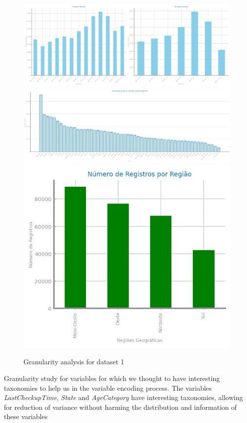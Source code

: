 \documentclass[10pt]{extarticle}
\begin{document}
\begin{figure}[H]
\centering\includegraphics[scale=0.5]{images/dataset1/data_preparation/CovidPos_AgeCategory_study_for_granularity.png}
\includegraphics[scale=0.4]{images/dataset1/data_preparation/CovidPos_State_study_for_granularity.png}
\centering\includegraphics[scale=1.0]{images/dataset1/data_preparation/CovidPos_State_per_region_study_for_granularity.png}
\caption{Granularity analysis for dataset 1}
\end{figure}
Granularity study for variables for which we thought to have interesting taxonomies to help us in the variable encoding process.
The variables \textit{LastCheckupTime}, \textit{State} and \textit{AgeCategory} have interesting taxonomies, allowing for 
reduction of variance without harming the distribution and information of these variables
\end{document}
